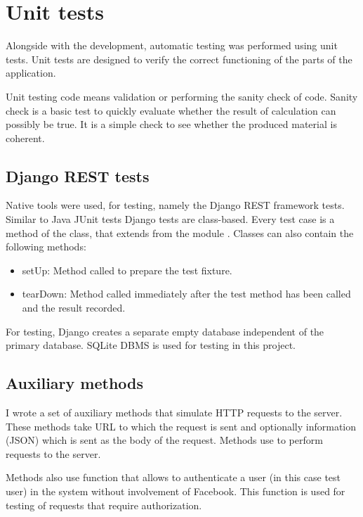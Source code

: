 \section{Unit tests}
Alongside with the development, automatic testing was performed using unit tests. Unit tests are designed to verify the correct functioning of the parts of the application.

Unit testing code means validation or performing the sanity check of code. Sanity check is a basic test to quickly evaluate whether the result of calculation can possibly be true. It is a simple check to see whether the produced material is coherent. \cite{unittesting}

\subsection{Django REST tests}
Native tools were used, for testing, namely the Django REST framework tests. Similar to Java JUnit tests Django tests are class-based. Every test case is a method of the class, that extends  from the module . Classes can also contain the following methods:

\begin{itemize}
\item{setUp}: Method called to prepare the test fixture.
\item{tearDown}: Method called immediately after the test method has been called and the result recorded.
\end{itemize}

For testing, Django creates a separate empty database independent of the primary database. SQLite DBMS is used for testing in this project.

\subsection{Auxiliary methods}
I wrote a set of auxiliary methods that simulate HTTP requests to the server. These methods take URL to which the request is sent and optionally information (JSON) which is sent as the body of the request. Methods use  to perform requests to the server.

Methods also use  function that allows to authenticate a user (in this case test user) in the system without involvement of Facebook. This function is used for testing of requests that require authorization.


